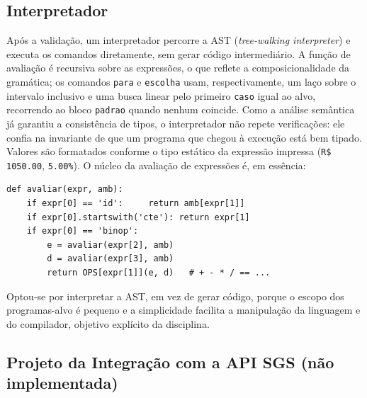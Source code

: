\documentclass[conference]{IEEEtran}
\begin{document}
\subsection{Interpretador}
\label{sec:interp}

Após a validação, um interpretador percorre a AST (\textit{tree-walking interpreter}) e executa os comandos diretamente, sem gerar código intermediário. A função de avaliação é recursiva sobre as expressões, o que reflete a composicionalidade da gramática; os comandos \texttt{para} e \texttt{escolha} usam, respectivamente, um laço sobre o intervalo inclusivo e uma busca linear pelo primeiro \texttt{caso} igual ao alvo, recorrendo ao bloco \texttt{padrao} quando nenhum coincide. Como a análise semântica já garantiu a consistência de tipos, o interpretador não repete verificações: ele confia na invariante de que um programa que chegou à execução está bem tipado. Valores são formatados conforme o tipo estático da expressão impressa (\texttt{R\$ 1050.00}, \texttt{5.00\%}). O núcleo da avaliação de expressões é, em essência:
\begin{minipage}{\columnwidth}\begin{lstlisting}
def avaliar(expr, amb):
    if expr[0] == 'id':     return amb[expr[1]]
    if expr[0].startswith('cte'): return expr[1]
    if expr[0] == 'binop':
        e = avaliar(expr[2], amb)
        d = avaliar(expr[3], amb)
        return OPS[expr[1]](e, d)   # + - * / == ...
\end{lstlisting}\end{minipage}\par\smallskip
Optou-se por interpretar a AST, em vez de gerar código, porque o escopo dos programas-alvo é pequeno e a simplicidade facilita a manipulação da linguagem e do compilador, objetivo explícito da disciplina.

\subsection{Projeto da Integração com a API SGS (não implementada)}
\end{document}
